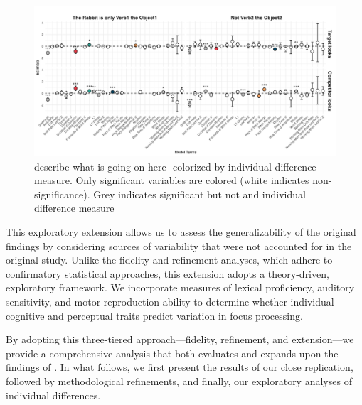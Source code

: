\begin{figure}[H]  %
    \centering
    \includegraphics[width=\textwidth,height=\textheight,keepaspectratio]{viz/id_gam_mod_out.png}
    \caption{describe what is going on here- colorized by individual difference measure. Only significant variables are colored (white indicates non-significance). Grey indicates significant but not and individual difference measure}
    \label{fig:id_gam_mod_out}
\end{figure}

This exploratory extension allows us to assess the generalizability of the original findings by considering sources of variability that were not accounted for in the original study. Unlike the fidelity and refinement analyses, which adhere to confirmatory statistical approaches, this extension adopts a theory-driven, exploratory framework. We incorporate measures of lexical proficiency, auditory sensitivity, and motor reproduction ability to determine whether individual cognitive and perceptual traits predict variation in focus processing.

By adopting this three-tiered approach—fidelity, refinement, and extension—we provide a comprehensive analysis that both evaluates and expands upon the findings of \cite{Ge2021}. In what follows, we first present the results of our close replication, followed by methodological refinements, and finally, our exploratory analyses of individual differences.



